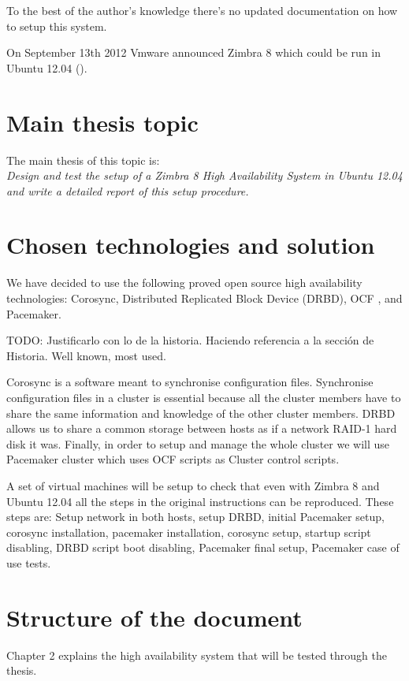 To the best of the author's knowledge there's no updated documentation on how to setup this system.

On September 13th 2012 Vmware announced Zimbra 8 which could be run in Ubuntu 12.04 (\cite{VmwareZimbra8Announce}).

\section {Main thesis topic}
The main thesis of this topic is: \\
\textit{Design and test the setup of a Zimbra 8 High Availability System in Ubuntu 12.04 and write a detailed report of this setup procedure.}

\section {Chosen technologies and solution}
We have decided to use the following proved open source high availability technologies: Corosync, Distributed Replicated Block Device (DRBD), OCF , and Pacemaker.

TODO: Justificarlo con lo de la historia. Haciendo referencia a la secci\'on de Historia. Well known, most used.

Corosync is a software meant to synchronise configuration files. Synchronise configuration files in a cluster is essential because all the cluster members have to share the same information and knowledge of the other cluster members. DRBD allows us to share a common storage between hosts as if a network RAID-1 hard disk it was. Finally, in order to setup and manage the whole cluster we will use Pacemaker cluster which uses OCF scripts as Cluster control scripts.

A set of virtual machines will be setup to check that even with Zimbra 8 and Ubuntu 12.04 all the steps in the original instructions can be reproduced. These steps are: Setup network in both hosts, setup DRBD, initial Pacemaker setup, corosync installation, pacemaker installation, corosync setup, startup script disabling, DRBD script boot disabling, Pacemaker final setup, Pacemaker case of use tests.

\section {Structure of the document}

Chapter 2 explains the high availability system that will be tested through the thesis.

